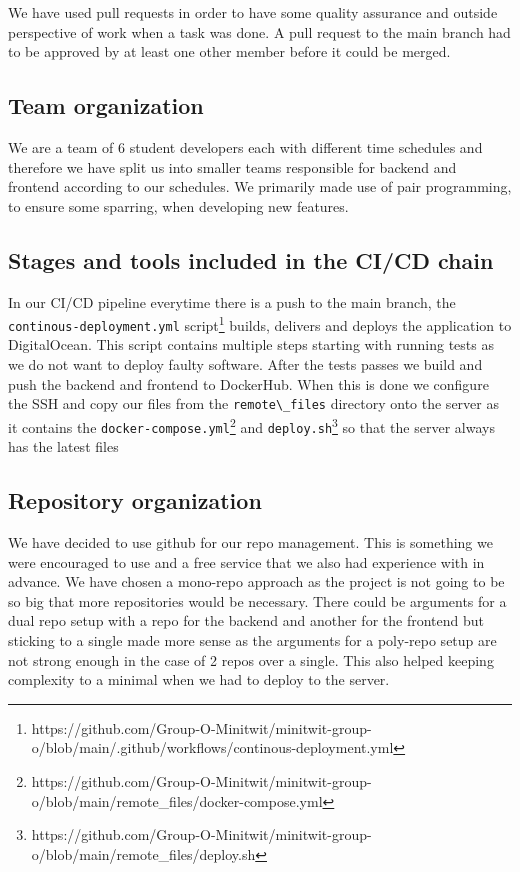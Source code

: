 \documentclass{article}
\begin{document}
We have used pull requests in order to have some quality assurance and outside perspective of work when a task was done. A pull request to the main branch had to be approved by at least one other member before it could be merged.
\subsection{Team organization}
We are a team of 6 student developers each with different time schedules and therefore we have split us into smaller teams responsible for backend and frontend according to our schedules. We primarily made use of pair programming, to ensure some sparring, when developing new features. 
\subsection{Stages and tools included in the CI/CD chain}

In our CI/CD pipeline everytime there is a push to the main branch, the \verb|continous-deployment.yml| script\footnote{https://github.com/Group-O-Minitwit/minitwit-group-o/blob/main/.github/workflows/continous-deployment.yml} builds, delivers and deploys the application to DigitalOcean. This script contains multiple steps starting with running tests as we do not want to deploy faulty software. After the tests passes we build and push the backend and frontend to DockerHub. When this is done we configure the SSH and copy our files from the \verb|remote\_files| directory onto the server as it contains the \verb|docker-compose.yml|\footnote{https://github.com/Group-O-Minitwit/minitwit-group-o/blob/main/remote\_files/docker-compose.yml} and \verb|deploy.sh|\footnote{https://github.com/Group-O-Minitwit/minitwit-group-o/blob/main/remote\_files/deploy.sh} so that the server always has the latest files

\subsection{Repository organization}
We have decided to use github for our repo management. This is something we were encouraged to use and a free service that we also had experience with in advance. We have chosen a mono-repo approach as the project is not going to be so big that more repositories would be necessary. There could be arguments for a dual repo setup with a repo for the backend and another for the frontend but sticking to a single made more sense as the arguments for a poly-repo setup are not strong enough in the case of 2 repos over a single. This also helped keeping complexity to a minimal when we had to deploy to the server.
\end{document}

